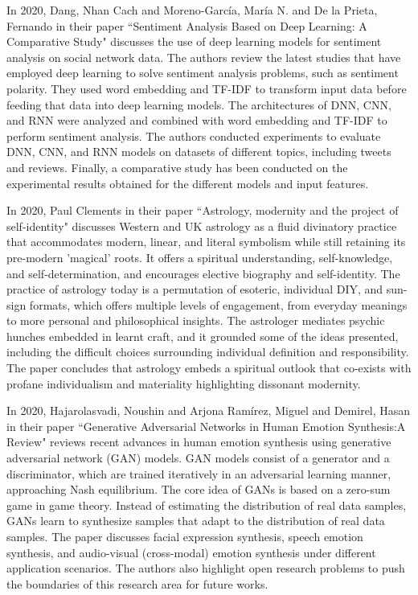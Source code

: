 In 2020, Dang, Nhan Cach and Moreno-García, María N. and De la Prieta, Fernando in their paper ``Sentiment Analysis Based on Deep Learning: A Comparative Study" discusses the use of deep learning models for sentiment analysis on social network data. The authors review the latest studies that have employed deep learning to solve sentiment analysis problems, such as sentiment polarity. They used word embedding and TF-IDF to transform input data before feeding that data into deep learning models. The architectures of DNN, CNN, and RNN were analyzed and combined with word embedding and TF-IDF to perform sentiment analysis. The authors conducted experiments to evaluate DNN, CNN, and RNN models on datasets of different topics, including tweets and reviews. Finally, a comparative study has been conducted on the experimental results obtained for the different models and input features\cite{electronics9030483}.
\vspace{1\baselineskip}

In 2020, Paul Clements in their paper ``Astrology, modernity and the project of self-identity" discusses Western and UK astrology as a fluid divinatory practice that accommodates modern, linear, and literal symbolism while still retaining its pre-modern 'magical' roots. It offers a spiritual understanding, self-knowledge, and self-determination, and encourages elective biography and self-identity. The practice of astrology today is a permutation of esoteric, individual DIY, and sun-sign formats, which offers multiple levels of engagement, from everyday meanings to more personal and philosophical insights. The astrologer mediates psychic hunches embedded in learnt craft, and it grounded some of the ideas presented, including the difficult choices surrounding individual definition and responsibility. The paper concludes that astrology embeds a spiritual outlook that co-exists with profane individualism and materiality highlighting dissonant modernity\cite{doi:10.1080/14755610.2022.2093234}.
\vspace{1\baselineskip}

In 2020, Hajarolasvadi, Noushin and Arjona Ramírez, Miguel and Demirel, Hasan in their paper ``Generative Adversarial Networks in Human Emotion Synthesis:A Review" reviews recent advances in human emotion synthesis using generative adversarial network (GAN) models. GAN models consist of a generator and a discriminator, which are trained iteratively in an adversarial learning manner, approaching Nash equilibrium. The core idea of GANs is based on a zero-sum game in game theory. Instead of estimating the distribution of real data samples, GANs learn to synthesize samples that adapt to the distribution of real data samples. The paper discusses facial expression synthesis, speech emotion synthesis, and audio-visual (cross-modal) emotion synthesis under different application scenarios. The authors also highlight open research problems to push the boundaries of this research area for future works\cite{article0}.
\vspace{1\baselineskip}

